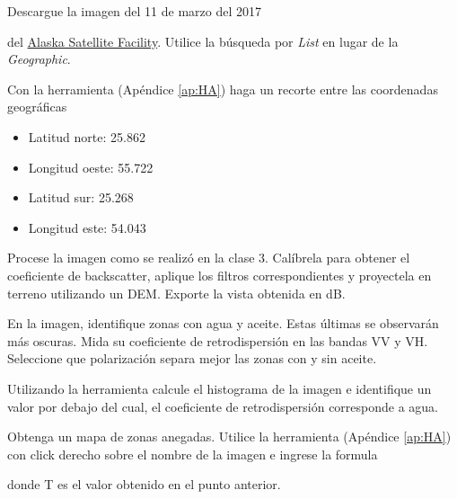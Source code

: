 \begin{que}
    Descargue la imagen del 11 de marzo del 2017
    \begin{center}\end{center} del \href{https://vertex.daac.asf.alaska.edu/}{Alaska Satellite Facility}. Utilice la búsqueda por \emph{List} en lugar de la \emph{Geographic}.
\end{que}

\begin{que}
    Con la herramienta  (Apéndice \ref{ap:HA}) haga un recorte entre las coordenadas geográficas
    \begin{itemize}
        \item Latitud norte: 25.862
        \item Longitud oeste: 55.722
        \item Latitud sur: 25.268
        \item Longitud este: 54.043
    \end{itemize}

\end{que}

\begin{que}
    Procese la imagen como se realizó en la clase 3. Calíbrela para obtener el coeficiente de backscatter, aplique los filtros correspondientes y proyectela en terreno utilizando un DEM. Exporte la vista obtenida en dB.
\end{que}

\begin{que}
    En la imagen, identifique zonas con agua y aceite. Estas últimas se observarán más oscuras. Mida su coeficiente de retrodispersión en las bandas VV y VH. Seleccione que polarización separa mejor las zonas con y sin aceite.
\end{que}


\begin{que}
    Utilizando la herramienta  calcule el histograma de la imagen e identifique un valor por debajo del cual, el coeficiente de retrodispersión corresponde a agua.
\end{que}

\begin{que}
  Obtenga un mapa de zonas anegadas. Utilice la herramienta  (Apéndice \ref{ap:HA}) con click derecho sobre el nombre de la imagen e ingrese la formula
  \begin{center}
  \end{center}
  donde T es el valor obtenido en el punto anterior.
\end{que}

